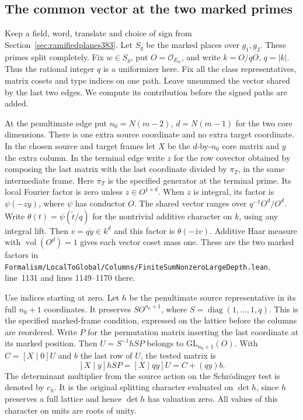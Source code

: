 \documentclass[a4paper,11pt]{article}
\theoremstyle{definition}
\theoremstyle{remark}
\newcommand{\srcloc}[2]{{\small\nolinkurl{#1.lean}}, line~#2}
\numberwithin{equation}{section}
\begin{document}
\subsection{The common vector at the two marked primes}
\label{sec:coupledgauss386}

Keep a field, word, translate and choice of sign from
Section~\ref{sec:ramifiedplanes383}. Let \(S_g\) be the marked
places over \(g_1,g_2\). These primes split completely.
Fix \(w\in S_g\), put \(O=\mathcal O_{E_w}\), and write
\(k=O/qO\), \(q=|k|\). Thus the rational integer \(q\) is
a uniformizer here. Fix all the class representatives, matrix
cosets and type indices on one path. Leave unsummed the vector
shared by the last two edges. We compute its contribution
before the signed paths are added.

At the penultimate edge put \(n_0=N(m-2)\), \(d=N(m-1)\)
for the two core dimensions. There is one extra source coordinate
and no extra target coordinate. In the chosen source and target
frames let \(X\) be the \(d\)-by-\(n_0\) core matrix and \(y\)
the extra column. In the terminal edge write \(z\) for the row
covector obtained by composing the last matrix with the last
coordinate divided by \(\pi_T\), in the same intermediate frame.
Here \(\pi_T\) is the specified generator at the terminal prime.
Its local Fourier factor is zero unless \(z\in O^{1\times d}\).
When \(z\) is integral, its factor is \(\psi(-zy)\), where
\(\psi\) has conductor \(O\). The shared vector ranges over
\(q^{-1}O^d/O^d\). Write \(\theta(t)=\psi(\tilde t/q)\)
for the nontrivial additive character on \(k\), using any
integral lift. Then \(v=\overline{qy}\in k^d\) and this factor
is \(\theta(-\bar z v)\). Additive Haar measure with
\(\operatorname{vol}(O^d)=1\) gives each vector coset mass one.
These are the two marked factors in
\srcloc{Formalism/LocalToGlobal/Columns/FiniteSumNonzeroLargeDepth}{1131}
and lines 1149--1170 there.

Use indices starting at zero. Let \(h\) be the penultimate
source representative in its full \(n_0+1\) coordinates.
It preserves \(S O^{n_0+1}\), where
\(S=\operatorname{diag}(1,\ldots,1,q)\).
This is the specified marked-frame condition, expressed on the
lattice before the columns are reordered. Write \(P\) for the
permutation matrix inserting the last coordinate at its marked
position. Then \(U=S^{-1}hSP\) belongs to
\(\mathrm{GL}_{n_0+1}(O)\). With \(C=[X\mid 0]U\) and \(b\)
the last row of \(U\), the tested matrix is
\[
     [X\mid y]hSP=[X\mid qy]U=C+(qy)b .
\]
The determinant multiplier from the source action on the
Schr\"odinger test is denoted by \(c_h\). It is the original
splitting character evaluated on \(\det h\), since \(h\)
preserves a full lattice and hence \(\det h\) has valuation
zero. All values of this character on units are roots of unity.
\end{document}
